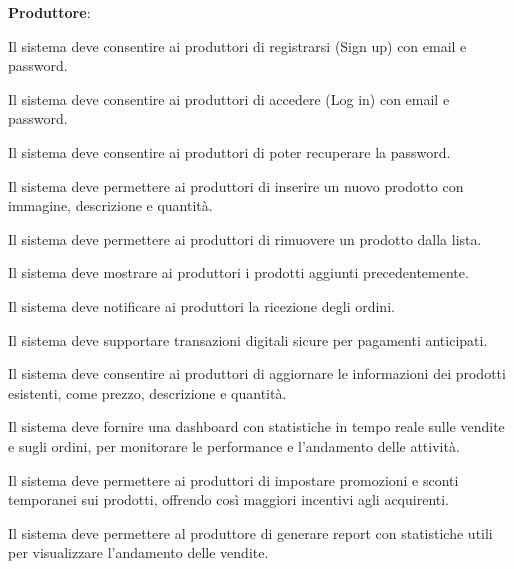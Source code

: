 \begin{rfenum}
\begin{rfenum}
        \end{rfenum}
        
    \item \textbf{Produttore}:
        \begin{rfenum}
            \item Il sistema deve consentire ai produttori di registrarsi (Sign up) con email e password.
            \item Il sistema deve consentire ai produttori di accedere (Log in) con email e password.
            \item Il sistema deve consentire ai produttori di poter recuperare la password.
            \item Il sistema deve permettere ai produttori di inserire un nuovo prodotto con immagine, descrizione e quantità.
            \item Il sistema deve permettere ai produttori di rimuovere un prodotto dalla lista.
            \item Il sistema deve mostrare ai produttori i prodotti aggiunti precedentemente.
            \item Il sistema deve notificare ai produttori la ricezione degli ordini.
            \item Il sistema deve supportare transazioni digitali sicure per pagamenti anticipati.
            \item  Il sistema deve consentire ai produttori di aggiornare le informazioni dei prodotti esistenti, come prezzo, descrizione e quantità.
            \item Il sistema deve fornire una dashboard con statistiche in tempo reale sulle vendite e sugli ordini, per monitorare le performance e l’andamento delle attività.
            \item \hypertarget{RF2.10}{} Il sistema deve permettere ai produttori di impostare promozioni e sconti temporanei sui prodotti, offrendo così maggiori incentivi agli acquirenti.
            \item Il sistema deve permettere al produttore di generare report con statistiche utili per visualizzare l'andamento delle vendite. \label{RF2.10}
        \end{rfenum}


\end{rfenum}

